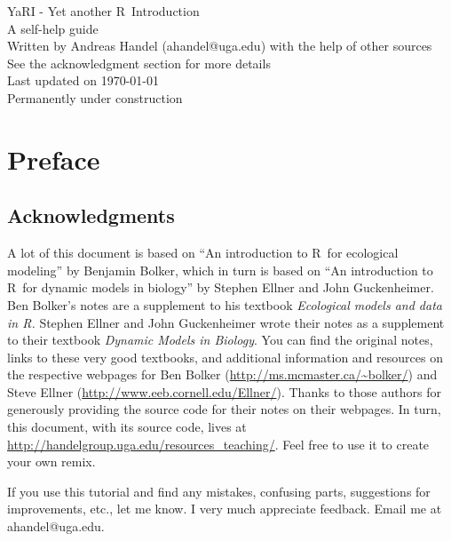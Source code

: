 \documentclass [11pt]{article}
\newcommand\R{{\sf R}}
\numberwithin{exercise}{section}
\begin{document}
\begin{center}
\Large YaRI - Yet another \R\ Introduction\\
A self-help guide\\
\vspace{0.25in}
\large  
Written by Andreas Handel (ahandel@uga.edu) with the help of other sources \\
See the acknowledgment section for more details\\
\normalsize 
\vspace{0.25in}
Last updated on \today \\
 Permanently under construction\\
\vspace{0.25in}
\end{center}

\tableofcontents 
\section{Preface \label{sec1}}

\subsection{Acknowledgments}
A lot of this document is based on ``An introduction to \R\ for ecological modeling'' by Benjamin Bolker, which in turn is based on ``An introduction to \R\ for dynamic models in biology'' by Stephen Ellner and John Guckenheimer. Ben Bolker's notes are a supplement to his textbook \textit{Ecological models and data in \R.} Stephen Ellner and John Guckenheimer wrote their notes as a supplement to their textbook \textit{Dynamic Models in Biology}. You can find the original notes, links to these very good textbooks, and additional information and resources on the respective webpages for Ben Bolker (\url{http://ms.mcmaster.ca/~bolker/}) and Steve Ellner (\url{http://www.eeb.cornell.edu/Ellner/}). Thanks to those authors for generously providing the source code for their notes on their webpages. In turn, this document, with its source code, lives at \url{http://handelgroup.uga.edu/resources_teaching/}. Feel free to use it to create your own remix.

If you use this tutorial and find any mistakes, confusing parts, suggestions for improvements, etc., let me know. I very much appreciate feedback. Email me at ahandel@uga.edu.
\end{document}
